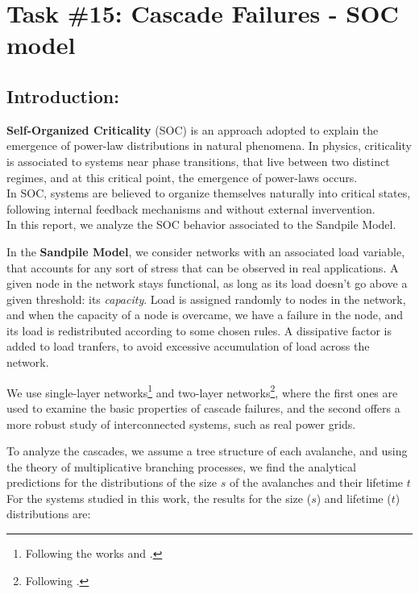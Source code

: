 \chapter{Task \#15: Cascade Failures - SOC model }
\section{Introduction:}

\textbf{Self-Organized Criticality} (SOC) is an approach adopted to explain the emergence of power-law distributions in natural phenomena. 
In physics, criticality is associated to systems near phase transitions, that live between two distinct regimes, 
and at this critical point, the emergence of power-laws occurs.\\
\noindent In SOC, systems are believed to organize themselves naturally into critical states, following internal feedback mechanisms and without external invervention.
\\
\noindent In this report, we analyze the SOC behavior associated to the Sandpile Model.

\noindent In the \textbf{Sandpile Model}, we consider networks with an associated load variable, that accounts for any sort of stress that can be observed in real applications. 
A given node in the network stays functional, as long as its load doesn't go above a given threshold: its \textit{capacity}. 
Load is assigned randomly to nodes in the network, and when the capacity of a node is overcame, we have a failure in the node, and its load is redistributed according to some chosen rules. 
A dissipative factor is added to load tranfers, to avoid excessive accumulation of load across the network.

\noindent We use single-layer networks\footnote{ Following the works \cite{doi:10.1143/JPSJ.64.327} and \cite{PhysRevLett.91.148701}.} and two-layer networks\footnote{ Following \cite{doi:10.1073/pnas.1110586109}.}, where the first ones are used to examine the basic properties of cascade failures, 
and the second offers a more robust study of interconnected systems, such as real power grids.

\noindent To analyze the cascades, we assume a tree structure of each avalanche, and using the theory of multiplicative branching processes, we find the analytical predictions for the distributions of the size $s$ of the avalanches and their lifetime $t$
\\
\noindent For the systems studied in this work, the results for the size ($s$) and lifetime ($t$) distributions are:

